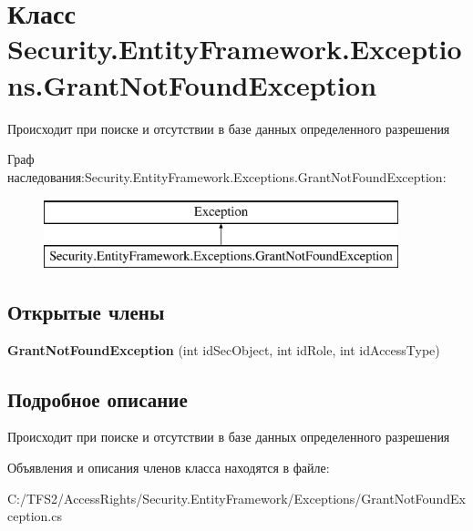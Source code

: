 \hypertarget{class_security_1_1_entity_framework_1_1_exceptions_1_1_grant_not_found_exception}{}\section{Класс Security.\+Entity\+Framework.\+Exceptions.\+Grant\+Not\+Found\+Exception}
\label{class_security_1_1_entity_framework_1_1_exceptions_1_1_grant_not_found_exception}


Происходит при поиске и отсутствии в базе данных определенного разрешения  


Граф наследования\+:Security.\+Entity\+Framework.\+Exceptions.\+Grant\+Not\+Found\+Exception\+:\begin{figure}[H]
\begin{center}
\leavevmode
\includegraphics[height=2.000000cm]{d3/dba/class_security_1_1_entity_framework_1_1_exceptions_1_1_grant_not_found_exception}
\end{center}
\end{figure}
\subsection*{Открытые члены}
\begin{DoxyCompactItemize}
\item 
\mbox{\label{class_security_1_1_entity_framework_1_1_exceptions_1_1_grant_not_found_exception_ac4dd61ce2b4385353343eaec4865fad5}} 
{\bfseries Grant\+Not\+Found\+Exception} (int id\+Sec\+Object, int id\+Role, int id\+Access\+Type)
\end{DoxyCompactItemize}


\subsection{Подробное описание}
Происходит при поиске и отсутствии в базе данных определенного разрешения 



Объявления и описания членов класса находятся в файле\+:\begin{DoxyCompactItemize}
\item 
C\+:/\+T\+F\+S2/\+Access\+Rights/\+Security.\+Entity\+Framework/\+Exceptions/Grant\+Not\+Found\+Exception.\+cs\end{DoxyCompactItemize}
